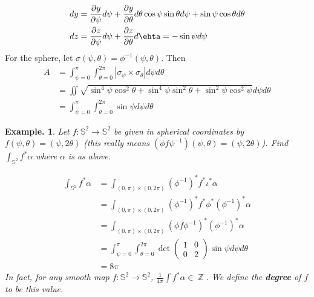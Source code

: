 \documentclass[11pt, a4paper]{memoir}
\DeclareMathOperator{\Z}{{\mathbb{Z}}}
\theoremstyle{change}
\theoremstyle{plain}
\theoremstyle{nonumberplain}
\newtheorem{example}{Example.}
\newcommand{\prt}[2]{\ensuremath{\frac{\partial #1}{\partial #2}}}
\numberwithin{equation}{section}
\begin{document}
\begin{align*}
    dy&=\prt{y}{\psi}d\psi+\prt{y}{\theta}d\theta\cos\psi\sin\theta d\psi+\sin\psi\cos\theta d\theta\\
    dz&=\prt{z}{\psi}d\psi+\prt{z}{\theta}d\ehta=-\sin\psi d\psi
\end{align*}
For the sphere, let $\sigma(\psi,\theta)=\phi^{-1}(\psi,\theta)$.
Then
\begin{align*}
    A &= \int_{\psi=0}^\pi\int_{\theta=0}^{2\pi}|\sigma_{\psi}\times\sigma_{\theta}|d\psi d\theta\\
      &= \iint\sqrt{\sin^4\psi\cos^2\theta+\sin^4\psi\sin^2\theta+\sin^2\psi\cos^2\psi}d\psi d\theta\\
      &= \int_{\psi=0}^\pi\int_{\theta=0}^{2\pi}\sin\psi d\psi d\theta
\end{align*}
\begin{example}
    Let $f:\mathbb{S}^2\to\mathbb{S}^2$ be given in spherical coordinates by $f(\psi,\theta)=(\psi,2\theta)$ (this really means $(\phi f \psi^{-1})(\psi,\theta)=(\psi,2\theta)$).
    Find $\int_{\mathbb{S}^2}f^*\alpha$ where $\alpha$ is as above.

    \begin{align*}
        \int_{\mathbb{S}^2}f^*\alpha &= \int_{(0,\pi)\times(0,2\pi)}(\phi^{-1})^*f^*\iota^*\alpha\\
                                     &= \int_{(0,\pi)\times(0,2\pi)}(\phi^{-1})^*f^*\phi^*(\phi^{-1})^*\alpha\\
                                     &= \int_{(0,\pi)\times(0,2\pi)}(\phi f\phi^{-1})^*(\phi^{-1})^*\alpha\\
                                     &= \int_{\psi=0}^\pi\int_{\theta=0}^{2\pi}\det\begin{pmatrix}1&0\\0&2\end{pmatrix}\sin\psi d\psi d\theta\\
                                     &= 8\pi
    \end{align*}
    In fact, for any smooth map $f:\mathbb{S}^2\to\mathbb{S}^2$, $\frac{1}{4\pi}\int f^*\alpha\in\Z$.
    We define the \textbf{degree} of $f$ to be this value.
\end{example}
\end{document}
